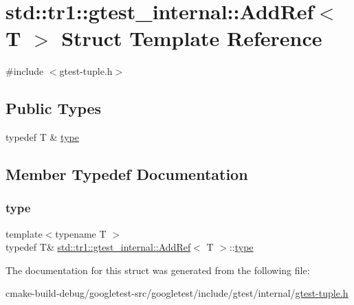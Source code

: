 \hypertarget{structstd_1_1tr1_1_1gtest__internal_1_1AddRef}{}\section{std\+::tr1\+::gtest\+\_\+internal\+::Add\+Ref$<$ T $>$ Struct Template Reference}
\label{structstd_1_1tr1_1_1gtest__internal_1_1AddRef}


{\ttfamily \#include $<$gtest-\/tuple.\+h$>$}

\subsection*{Public Types}
\begin{DoxyCompactItemize}
\item 
typedef T \& \mbox{\hyperlink{structstd_1_1tr1_1_1gtest__internal_1_1AddRef_a1e5616e414125574c1653e3a1fc68491}{type}}
\end{DoxyCompactItemize}


\subsection{Member Typedef Documentation}
\mbox{\label{structstd_1_1tr1_1_1gtest__internal_1_1AddRef_a1e5616e414125574c1653e3a1fc68491}} 
\subsubsection{\texorpdfstring{type}{type}}
{\footnotesize\ttfamily template$<$typename T $>$ \\
typedef T\& \mbox{\hyperlink{structstd_1_1tr1_1_1gtest__internal_1_1AddRef}{std\+::tr1\+::gtest\+\_\+internal\+::\+Add\+Ref}}$<$ T $>$\+::\mbox{\hyperlink{structstd_1_1tr1_1_1gtest__internal_1_1AddRef_a1e5616e414125574c1653e3a1fc68491}{type}}}



The documentation for this struct was generated from the following file\+:\begin{DoxyCompactItemize}
\item 
cmake-\/build-\/debug/googletest-\/src/googletest/include/gtest/internal/\mbox{\hyperlink{gtest-tuple_8h}{gtest-\/tuple.\+h}}\end{DoxyCompactItemize}
